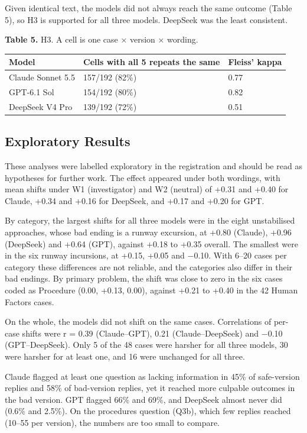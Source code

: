 \documentclass{aer}
\begin{document}
Given identical text, the models did not always reach the same outcome (Table 5), so H3 is supported for all three models. DeepSeek was the least consistent.

\noindent\textbf{Table 5.} H3. A cell is one case × version × wording.

\begin{longtable}[]{@{}lll@{}}
\toprule\noalign{}
Model & Cells with all 5 repeats the same & Fleiss' kappa \\
\midrule\noalign{}
\endhead
\bottomrule\noalign{}
\endlastfoot
Claude Sonnet 5.5 & 157/192 (82\%) & 0.77 \\
GPT-6.1 Sol & 154/192 (80\%) & 0.82 \\
DeepSeek V4 Pro & 139/192 (72\%) & 0.51 \\
\end{longtable}


\hypertarget{exploratory-results}{%
\subsection{Exploratory Results}\label{exploratory-results}}

These analyses were labelled exploratory in the registration and should be read as hypotheses for further work. The effect appeared under both wordings, with mean shifts under W1 (investigator) and W2 (neutral) of +0.31 and +0.40 for Claude, +0.34 and +0.16 for DeepSeek, and +0.17 and +0.20 for GPT.

By category, the largest shifts for all three models were in the eight unstabilised approaches, whose bad ending is a runway excursion, at +0.80 (Claude), +0.96 (DeepSeek) and +0.64 (GPT), against +0.18 to +0.35 overall. The smallest were in the six runway incursions, at +0.15, +0.05 and −0.10. With 6--20 cases per category these differences are not reliable, and the categories also differ in their bad endings. By primary problem, the shift was close to zero in the six cases coded as Procedure (0.00, +0.13, 0.00), against +0.21 to +0.40 in the 42 Human Factors cases.

On the whole, the models did not shift on the same cases. Correlations of per-case shifts were r = 0.39 (Claude--GPT), 0.21 (Claude--DeepSeek) and −0.10 (GPT--DeepSeek). Only 5 of the 48 cases were harsher for all three models, 30 were harsher for at least one, and 16 were unchanged for all three.

Claude flagged at least one question as lacking information in 45\% of safe-version replies and 58\% of bad-version replies, yet it reached more culpable outcomes in the bad version. GPT flagged 66\% and 69\%, and DeepSeek almost never did (0.6\% and 2.5\%). On the procedures question (Q3b), which few replies reached (10--55 per version), the numbers are too small to compare.
\end{document}
